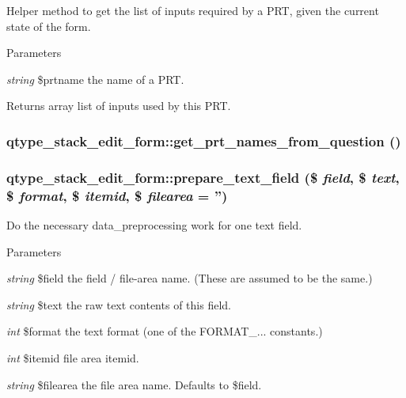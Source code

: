 \label{classqtype__stack__edit__form_a60fd5f24aa7d7540570f39439326a0c9}
Helper method to get the list of inputs required by a PRT, given the current state of the form. 
\begin{DoxyParams}{Parameters}
\item[{\em string}]\$prtname the name of a PRT. \end{DoxyParams}
\begin{DoxyReturn}{Returns}
array list of inputs used by this PRT. 
\end{DoxyReturn}
\hypertarget{classqtype__stack__edit__form_ac826cc7492feb8b22e7b952c4d72b022}{
\subsubsection[{get\_\-prt\_\-names\_\-from\_\-question}]{\setlength{\rightskip}{0pt plus 5cm}qtype\_\-stack\_\-edit\_\-form::get\_\-prt\_\-names\_\-from\_\-question ()}}
\label{classqtype__stack__edit__form_ac826cc7492feb8b22e7b952c4d72b022}
\hypertarget{classqtype__stack__edit__form_a6d3ed4f4c221ea06eb1375f07e81c583}{
\subsubsection[{prepare\_\-text\_\-field}]{\setlength{\rightskip}{0pt plus 5cm}qtype\_\-stack\_\-edit\_\-form::prepare\_\-text\_\-field (\$ {\em field}, \/  \$ {\em text}, \/  \$ {\em format}, \/  \$ {\em itemid}, \/  \$ {\em filearea} = {\ttfamily ''})}}
\label{classqtype__stack__edit__form_a6d3ed4f4c221ea06eb1375f07e81c583}
Do the necessary data\_\-preprocessing work for one text field. 
\begin{DoxyParams}{Parameters}
\item[{\em string}]\$field the field / file-\/area name. (These are assumed to be the same.) \item[{\em string}]\$text the raw text contents of this field. \item[{\em int}]\$format the text format (one of the FORMAT\_\-... constants.) \item[{\em int}]\$itemid file area itemid. \item[{\em string}]\$filearea the file area name. Defaults to \$field. \end{DoxyParams}
